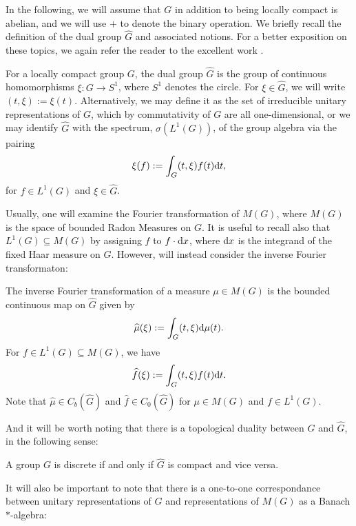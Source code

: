 In the following, we will assume that $G$ in addition to being locally compact is abelian, and we will use $+$ to denote the binary operation. We briefly recall the definition of the dual group $\hat G$ and associated notions. For a better exposition on these topics, we again refer the reader to the excellent work \cite{folland2016fourier}. 
\begin{definition}
	For a locally compact group $G$, the dual group $\hat G$ is the group of continuous homomorphisms $\xi \colon G \to S^1$, where $S^1$ denotes the circle. For $\xi \in \hat G$, we will write $(t,\xi) := \xi(t)$. Alternatively, we may define it as the set of irreducible unitary representations of $G$, which by commutativity of $G$ are all one-dimensional, or we may identify $\hat G$ with the spectrum, $\sigma(L^1(G))$, of the group algebra via the pairing
	\begin{align}
		\xi(f):=\int_G (t , \xi) f(t) \mathrm{d} t,
		\label{abel:fourier}
	\end{align}
	for $f \in L^1(G)$ and $\xi \in \hat G$. 
\end{definition}
Usually, one will examine the Fourier transformation of $M(G)$, where $M(G)$ is the space of bounded Radon Measures on $G$. It is useful to recall also that $L^1(G) \subseteq M(G)$ by assigning $f$ to $f \cdot \mathrm{d} x$, where $\mathrm{d} x$ is the integrand of the fixed Haar measure on $G$. However, will instead consider the inverse Fourier transformaton:
\begin{definition}
	The inverse Fourier transformation of a measure $\mu \in M(G)$ is the bounded continuous map on $\hat G$ given by 
	\begin{align*}
	\widehat{\mu}(\xi) := \int_G	(t, \xi) \mathrm{d} \mu(t).
	\end{align*}
	For $f \in L^1(G) \subseteq M(G)$, we have
	\begin{align*}
		\widehat{f}(\xi) := \int_G (t, \xi) f(t) \mathrm{d} t.
	\end{align*}
	Note that $\hat \mu \in C_b(\hat G)$ and $\hat f \in C_0(\hat G)$ for $\mu \in M(G)$ and $f \in L^1(G)$.
\end{definition}
And it will be worth noting that there is a topological duality between $G$ and $\hat G$, in the following sense:
\begin{proposition}
	A group $G$ is discrete if and only if $\hat G$ is compact and vice versa.
\end{proposition}
It will also be important to note that there is a one-to-one correspondance between unitary representations of $G$ and representations of $M(G)$ as a Banach $*$-algebra:
